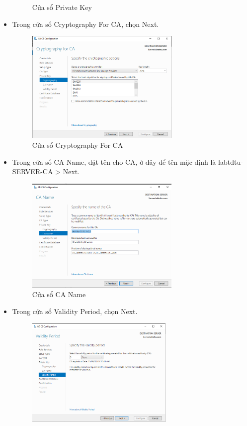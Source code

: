 \documentclass[13pt]{report}
\begin{document}
\begin{itemize}
\begin{figure}[htp]
			\caption{Cửa sổ Private Key}
		\end{figure}
		\newpage
		\item Trong cửa sổ Cryptography For CA, chọn Next.
		\begin{figure}[htp]
			\centering
			\includegraphics[width=0.7\textwidth]{image/Gui/ADCS/19.png}
			\caption{Cửa sổ Cryptography For CA}
		\end{figure}
		\item Trong cửa sổ CA Name, đặt tên cho CA, ở đây để tên mặc định là labtdtu-SERVER-CA > Next.
		\begin{figure}[htp]
			\centering
			\includegraphics[width=0.7\textwidth]{image/Gui/ADCS/20.png}
			\caption{Cửa sổ CA Name}
		\end{figure}
		\newpage
		\item Trong cửa sổ Validity Period, chọn Next.
		\begin{figure}[htp]
			\centering
			\includegraphics[width=0.67\textwidth]{image/Gui/ADCS/21.png}

\end{figure}
\end{itemize}
\end{document}
